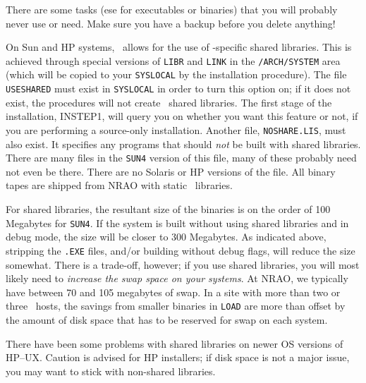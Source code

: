 \medskip\noindent

There are some tasks (\AIPS ese for executables or binaries) that you
will probably never use or need.  Make sure you have a backup before
you delete anything!

On Sun and HP systems, \AIPS\ allows for the use of \AIPS-specific shared
libraries.  This is achieved through special versions of {\tt \dol LIBR}
and {\tt\dol LINK} in the {\tt \thisver/\dol ARCH/SYSTEM} area (which will
be copied to your {\tt\dol SYSLOCAL} by the installation procedure).  The
file {\tt USESHARED} must exist in {\tt\dol SYSLOCAL} in order to turn
this option on; if it does not exist, the procedures will not create
\AIPS\ shared libraries.  The first stage of the installation, INSTEP1,
will query you on whether you want this feature or not, if you are
performing a source-only installation.  Another file, {\tt NOSHARE.LIS},
must also exist.  It specifies any programs that should {\it not} be built
with shared libraries.  There are many files in the {\tt SUN4} version of
this file, many of these probably need not even be there.  There are no
Solaris or HP versions of the file.  All binary tapes are shipped from
NRAO with static \AIPS\ libraries.

For shared libraries, the resultant size of the binaries is on the order
of 100 Megabytes for {\tt SUN4}.
If the system is built without using shared libraries and in debug mode,
the size will be closer to 300 Megabytes.  As indicated above, stripping
the {\tt *.EXE} files, and/or building without debug flags, will reduce
the size somewhat.  There is a trade-off, however; if you use shared
libraries, you will most likely need to {\it increase the swap space on
your systems\/}.  At NRAO, we typically have between 70 and 105 megabytes
of swap.  In a site with more than two or three \AIPS\ hosts, the savings
from smaller binaries in {\tt\dol LOAD} are more than offset by the amount
of disk space that has to be reserved for swap on each system.

There have been some problems with shared libraries on newer OS versions
of HP--UX.  Caution is advised for HP installers; if disk space is not a
major issue, you may want to stick with non-shared libraries.

\medskip{}

